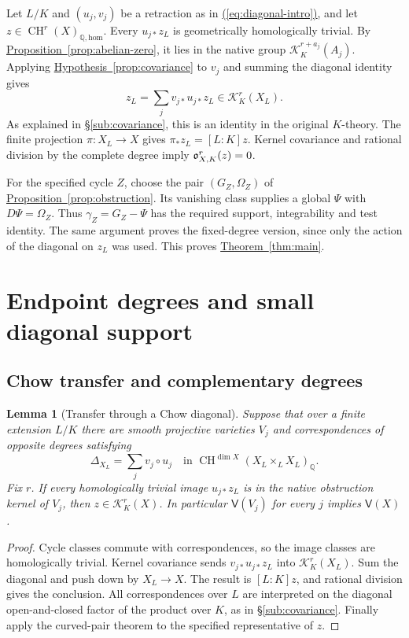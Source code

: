 \documentclass[11pt,a4paper]{article}
\newtheorem{lemma}[theorem]{Lemma}
\theoremstyle{definition}
\theoremstyle{remark}\newtheorem{remark}[theorem]{Remark}
\numberwithin{equation}{section}
\newcommand{\Q}{\mathbb Q}\newcommand{\R}{\mathbb R}\newcommand{\C}{\mathbb C}
\newcommand{\CH}{\operatorname{CH}}\newcommand{\an}{\mathrm{an}}
\newcommand{\homol}{\mathrm{hom}}\newcommand{\BC}{\mathrm{BC}}
\newcommand{\cK}{\mathcal K}\newcommand{\cH}{\mathcal H}
\newcommand{\subref}[1]{\hyperref[#1]{\textcolor{sectionlink}{\S\ref*{#1}}}}
\newcommand{\thmref}[1]{\hyperref[#1]{\textcolor{resultlink}{Theorem~\ref*{#1}}}}
\newcommand{\propref}[1]{\hyperref[#1]{\textcolor{resultlink}{Proposition~\ref*{#1}}}}
\newcommand{\hypref}[1]{\hyperref[#1]{\textcolor{resultlink}{Hypothesis~\ref*{#1}}}}
\renewcommand{\eqref}[1]{\hyperref[#1]{\textcolor{equationlink}{(\ref*{#1})}}}
\begin{document}
Let $L/K$ and $(u_j,v_j)$ be a retraction as in
\eqref{eq:diagonal-intro}, and let $z\in\CH^r(X)_{\Q,\homol}$.
Every $u_{j*}z_L$ is geometrically homologically trivial.
By \propref{prop:abelian-zero}, it lies in the native group
$\mathcal K_K^{r+a_j}(A_j)$. Applying \hypref{prop:covariance} to
$v_j$ and summing the diagonal identity gives
\[
               z_L=\sum_jv_{j*}u_{j*}z_L\in\mathcal K_K^r(X_L).
\]
As explained in \subref{sub:covariance}, this is an identity in the
original $K$-theory. The finite projection $\pi:X_L\to X$ gives
$\pi_*z_L=[L:K]z$. Kernel covariance and rational division by the
complete degree imply $\mathfrak o^r_{X,K}(z)=0$.

For the specified cycle $Z$, choose the pair $(G_Z,\Omega_Z)$ of
\propref{prop:obstruction}. Its vanishing class supplies a global
$\Psi$ with $D\Psi=\Omega_Z$. Thus $\gamma_Z=G_Z-\Psi$ has
the required support, integrability and test identity. The same
argument proves the fixed-degree version, since only the action
of the diagonal on $z_L$ was used. This proves \thmref{thm:main}.


\section{Endpoint degrees and small diagonal support}\label{sec:endpoints}

\subsection{Chow transfer and complementary degrees}

\begin{lemma}[Transfer through a Chow diagonal]\label{lem:general-transfer}
Suppose that over a finite extension $L/K$ there are smooth projective
varieties $V_j$ and correspondences of opposite degrees satisfying
\[
 \Delta_{X_L}=\sum_jv_j\circ u_j
 \quad\text{in }\CH^{\dim X}(X_L\times_LX_L)_\Q.
\]
Fix $r$. If every homologically trivial image $u_{j*}z_L$ is in the
native obstruction kernel of $V_j$, then
$z\in\cK_K^r(X)$. In particular $\mathsf V(V_j)$ for every $j$
implies $\mathsf V(X)$.
\end{lemma}

\begin{proof}
Cycle classes commute with correspondences, so the image classes are
homologically trivial. Kernel covariance sends $v_{j*}u_{j*}z_L$ into
$\cK_K^r(X_L)$. Sum the diagonal and push down by $X_L\to X$.
The result is $[L:K]z$, and rational division gives the conclusion.
All correspondences over $L$ are interpreted on the diagonal
open-and-closed factor of the product over $K$, as in
\subref{sub:covariance}. Finally apply the curved-pair theorem to the
specified representative of $z$.
\end{proof}
\end{document}
